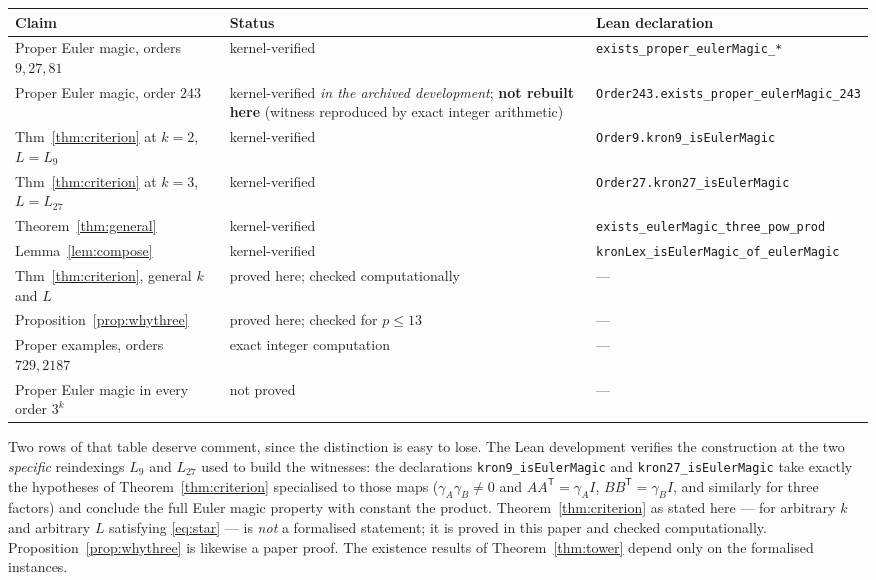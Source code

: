 \documentclass[11pt,a4paper]{amsart}
\theoremstyle{plain}
\theoremstyle{definition}
\theoremstyle{remark}
\newcommand{\tr}{\mathsf{T}}
\begin{document}
\begin{center}\footnotesize
\begin{tabular}{@{}p{}p{}p{}@{}}
\toprule
Claim & Status & Lean declaration\\
\midrule
Proper Euler magic, orders $9,27,81$ & kernel-verified &
  \texttt{exists\_proper\_}\-\texttt{eulerMagic\_*}\\[2pt]
Proper Euler magic, order $243$ & kernel-verified \emph{in the archived
  development}; \textbf{not rebuilt here} (witness reproduced by exact integer
  arithmetic) &
  \texttt{Order243.exists\_proper\_}\-\texttt{eulerMagic\_243}\\[2pt]
Thm~\ref{thm:criterion} at $k=2$, $L=L_9$ & kernel-verified &
  \texttt{Order9.}\-\texttt{kron9\_isEulerMagic}\\[2pt]
Thm~\ref{thm:criterion} at $k=3$, $L=L_{27}$ & kernel-verified &
  \texttt{Order27.}\-\texttt{kron27\_isEulerMagic}\\[2pt]
Theorem~\ref{thm:general} & kernel-verified &
  \texttt{exists\_eulerMagic\_}\-\texttt{three\_pow\_prod}\\[2pt]
Lemma~\ref{lem:compose} & kernel-verified &
  \texttt{kronLex\_isEulerMagic\_}\-\texttt{of\_eulerMagic}\\[2pt]
Thm~\ref{thm:criterion}, general $k$ and $L$ & proved here; checked
  computationally & ---\\[2pt]
Proposition~\ref{prop:whythree} & proved here; checked for $p\le13$ & ---\\[2pt]
Proper examples, orders $729,2187$ & exact integer computation & ---\\[2pt]
Proper Euler magic in every order $3^k$ & not proved & ---\\
\bottomrule
\end{tabular}
\end{center}

Two rows of that table deserve comment, since the distinction is easy to lose.
The Lean development verifies the construction at the two \emph{specific}
reindexings $L_9$ and $L_{27}$ used to build the witnesses: the declarations
\texttt{kron9\_isEulerMagic} and \texttt{kron27\_isEulerMagic} take exactly the
hypotheses of Theorem~\ref{thm:criterion} specialised to those maps
($\gamma_A\gamma_B\ne0$ and $AA^{\tr}=\gamma_A I$, $BB^{\tr}=\gamma_B I$, and
similarly for three factors) and conclude the full Euler magic property with
constant the product. Theorem~\ref{thm:criterion} as stated here --- for
arbitrary $k$ and arbitrary $L$ satisfying \eqref{eq:star} --- is \emph{not} a
formalised statement; it is proved in this paper and checked computationally.
Proposition~\ref{prop:whythree} is likewise a paper proof. The existence results
of Theorem~\ref{thm:tower} depend only on the formalised instances.
\end{document}

